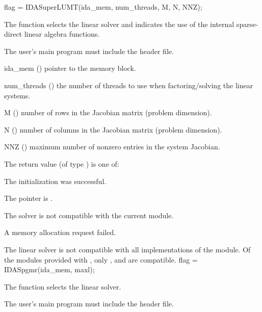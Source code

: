 {
  flag = IDASuperLUMT(ida\_mem, num\_threads, M, N, NNZ);
}
{
  The function  selects the {\idasuperlumt} linear
  solver and indicates the use of the internal sparse-direct linear
  algebra functions.

  The user's main program must include the  header file.
}
{
  \begin{args}
  \item[ida\_mem] ()
    pointer to the {\ida} memory block.
  \item[num\_threads] ()
    the number of threads to use when factoring/solving the linear systems.
  \item[M] ()
    number of rows in the Jacobian matrix (problem dimension).
  \item[N] ()
    number of columns in the Jacobian matrix (problem dimension).
  \item[NNZ] ()
    maximum number of nonzero entries in the system Jacobian.
  \end{args}
}
{
  The return value  (of type ) is one of:
  \begin{args}
  \item[\Id{IDASLS\_SUCCESS}] 
    The {\idasuperlumt} initialization was successful.
  \item[\Id{IDASLS\_MEM\_NULL}]
    The  pointer is .
  \item[\Id{IDASLS\_ILL\_INPUT}]
    The {\idasuperlumt} solver is not compatible with the current {\nvector} module.
  \item[\Id{IDASLS\_MEM\_FAIL}]
    A memory allocation request failed.
  \end{args}
}
{
  The {\idasuperlumt} linear solver is not compatible with all
  implementations of the {\nvector} module. 
  Of the {\nvector} modules provided with {\sundials}, only {\nvecs},
  {\nvecopenmp} and {\nvecpthreads} are compatible.
}
{
  flag = IDASpgmr(ida\_mem, maxl);
}
{
  The function  selects the {\idaspgmr} linear solver. 

  The user's main program must include the  header file.
}

